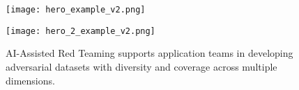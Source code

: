 \begin{figure}[h!tbp]
    \texttt{[image: hero\_example\_v2.png]}
    \caption{AI-Assisted Red Teaming supports application teams in developing adversarial datasets with diversity and coverage across multiple dimensions.}
    \label{fig:prompt}
     \texttt{[image: hero\_2\_example\_v2.png]}
\end{figure}